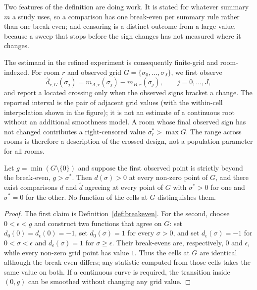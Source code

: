 Two features of the definition are doing work. It is stated for whatever summary
$m$ a study uses, so a comparison has one break-even per summary rule rather than
one break-even; and censoring is a distinct outcome from a large value, because
a sweep that stops before the sign changes has not measured where it changes.

The estimand in the refined experiment is consequently finite-grid and
room-indexed. For room $r$ and observed grid
$G=\{\sigma_0,\ldots,\sigma_J\}$, we first observe
\[
  \widehat d_{r,G}(\sigma_j)
  = m_{A,r}(\sigma_j)-m_{B,r}(\sigma_j),
  \qquad j=0,\ldots,J,
\]
and report a located crossing only when the observed signs bracket a change.
The reported interval is the pair of adjacent grid values (with the
within-cell interpolation shown in the figure); it is not an estimate of a
continuous root without an additional smoothness model. A room whose final
observed sign has not changed contributes a right-censored value
$\sigma^\ast_r>\max G$. The range across rooms is therefore a description of
the crossed design, not a population parameter for all rooms.

\begin{proposition}
\label{prop:gridsign}
Let $g = \min (G \setminus \{0\})$ and suppose the first observed point is
strictly beyond the break-even, $g > \sigma^\ast$. Then $d(\sigma) > 0$ at
every non-zero point of $G$, and there exist comparisons $d$ and $\tilde d$
agreeing at every point of $G$ with $\sigma^\ast > 0$ for one and
$\sigma^\ast = 0$ for the other. No function of the cells at $G$ distinguishes
them.
\end{proposition}

\begin{proof}
The first claim is Definition~\ref{def:breakeven}. For the second, choose
$0<\epsilon<g$ and construct two functions that agree on $G$: set
$d_0(0)=d_\epsilon(0)=-1$, set $d_0(\sigma)=1$ for every $\sigma>0$, and set
$d_\epsilon(\sigma)=-1$ for $0<\sigma<\epsilon$ and
$d_\epsilon(\sigma)=1$ for $\sigma\geq\epsilon$. Their break-evens are,
respectively, $0$ and $\epsilon$, while every non-zero grid point has value
$1$. Thus the cells at $G$ are identical although the break-even differs; any
statistic computed from those cells takes the same value on both. If a
continuous curve is required, the transition inside $(0,g)$ can be smoothed
without changing any grid value.
\end{proof}

